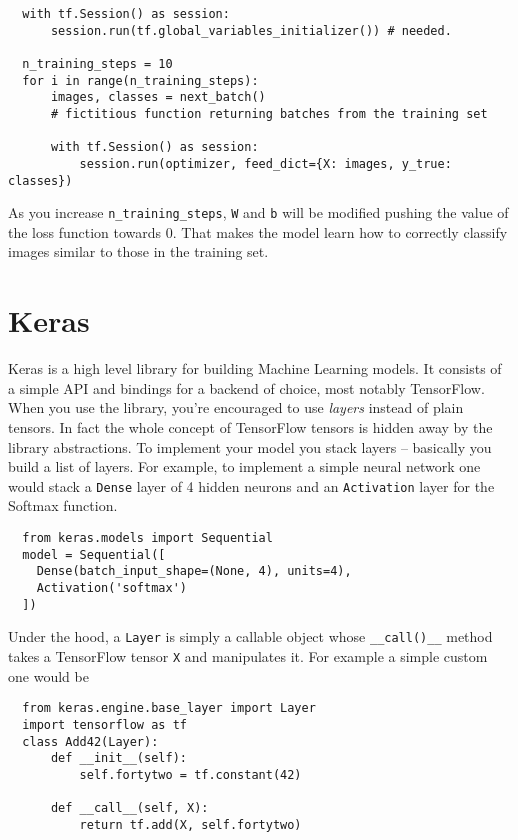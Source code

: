 \begin{verbatim}
  with tf.Session() as session:
      session.run(tf.global_variables_initializer()) # needed.

  n_training_steps = 10
  for i in range(n_training_steps):
      images, classes = next_batch()
      # fictitious function returning batches from the training set

      with tf.Session() as session:
          session.run(optimizer, feed_dict={X: images, y_true: classes})
\end{verbatim}

As you increase \texttt{n\_training\_steps}, \texttt{W} and \texttt{b}
will be modified pushing the value of the loss function towards 0. That
makes the model learn how to correctly classify images similar to those
in the training set.

\section{Keras}
\label{sec:keras}

Keras is a high level library for building Machine Learning models. It
consists of a simple API and bindings for a backend of choice, most
notably TensorFlow. When you use the library, you're encouraged to use
\emph{layers} instead of plain tensors. In fact the whole concept of
TensorFlow tensors is hidden away by the library abstractions. To
implement your model you stack layers -- basically you build a list of
layers. For example, to implement a simple neural network one would
stack a \texttt{Dense} layer of 4 hidden neurons and an
\texttt{Activation} layer for the Softmax function.

\begin{verbatim}
  from keras.models import Sequential
  model = Sequential([
    Dense(batch_input_shape=(None, 4), units=4),
    Activation('softmax')
  ])
\end{verbatim}

Under the hood, a \texttt{Layer} is simply a callable object whose
\texttt{\_\_call()\_\_} method takes a TensorFlow tensor \texttt{X} and
manipulates it. For example a simple custom one would be
\begin{verbatim}
  from keras.engine.base_layer import Layer
  import tensorflow as tf
  class Add42(Layer):
      def __init__(self):
          self.fortytwo = tf.constant(42)

      def __call__(self, X):
          return tf.add(X, self.fortytwo)
\end{verbatim}

